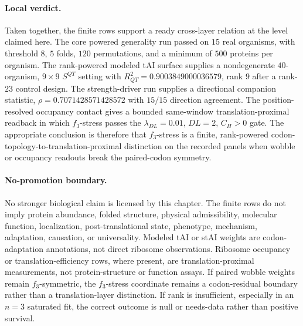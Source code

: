 \paragraph{Local verdict.}
Taken together, the finite rows support a ready cross-layer relation at the level claimed here.  The core powered generality run passed on $15$ real organisms, with threshold $8$, $5$ folds, $120$ permutations, and a minimum of $500$ proteins per organism.  The rank-powered modeled tAI surface supplies a nondegenerate $40$-organism, $9\times 9$ $S^{QT}$ setting with $R^2_{QT}=0.9003849000036579$, rank $9$ after a rank-$23$ control design.  The strength-driver run supplies a directional companion statistic, $\rho=0.7071428571428572$ with $15/15$ direction agreement.  The position-resolved occupancy contact gives a bounded same-window translation-proximal readback in which $f_3$-stress passes the $\lambda_{DL}=0.01$, $DL=2$, $C_H>0$ gate.  The appropriate conclusion is therefore that $f_3$-stress is a finite, rank-powered codon-topology-to-translation-proximal distinction on the recorded panels when wobble or occupancy readouts break the paired-codon symmetry.

\paragraph{No-promotion boundary.}
No stronger biological claim is licensed by this chapter.  The finite rows do not imply protein abundance, folded structure, physical admissibility, molecular function, localization, post-translational state, phenotype, mechanism, adaptation, causation, or universality.  Modeled tAI or stAI weights are codon-adaptation annotations, not direct ribosome observations.  Ribosome occupancy or translation-efficiency rows, where present, are translation-proximal measurements, not protein-structure or function assays.  If paired wobble weights remain $f_3$-symmetric, the $f_3$-stress coordinate remains a codon-residual boundary rather than a translation-layer distinction.  If rank is insufficient, especially in an $n=3$ saturated fit, the correct outcome is null or needs-data rather than positive survival.